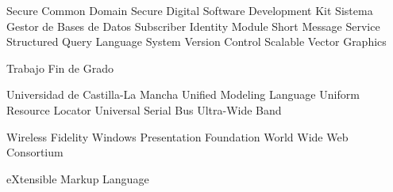 {\begin{acronym}[XXXXXXXX]
       {Secure Common Domain}
        {Secure Digital}
       {Software Development Kit}
      {Sistema Gestor de Bases de Datos}
       {Subscriber Identity Module}
       {Short Message Service}
       {Structured Query Language}
       {System Version Control}
       {Scalable Vector Graphics}

       {Trabajo Fin de Grado}

      {Universidad de Castilla-La Mancha}
       {Unified Modeling Language}
       {Uniform Resource Locator}
       {Universal Serial Bus}
       {Ultra-Wide Band}

      {Wireless Fidelity}
       {Windows Presentation Foundation}
       {World Wide Web Consortium}

       {eXtensible Markup Language}
\end{acronym}
}




